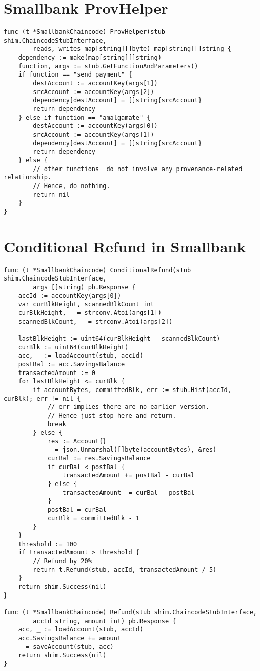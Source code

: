 \section{Smallbank ProvHelper}
\label{ch:append:contracts:smallbank_prov}
\begin{lstlisting}
func (t *SmallbankChaincode) ProvHelper(stub shim.ChaincodeStubInterface, 
        reads, writes map[string][]byte) map[string][]string {
	dependency := make(map[string][]string)
	function, args := stub.GetFunctionAndParameters()
	if function == "send_payment" {
		destAccount := accountKey(args[1])
		srcAccount := accountKey(args[2])
		dependency[destAccount] = []string{srcAccount}
		return dependency
	} else if function == "amalgamate" {
		destAccount := accountKey(args[0])
		srcAccount := accountKey(args[1])
		dependency[destAccount] = []string{srcAccount}
		return dependency
	} else {
		// other functions  do not involve any provenance-related relationship.
		// Hence, do nothing.
		return nil
    }
}
\end{lstlisting}

\section{Conditional Refund in Smallbank}
\label{ch:append:contracts:cond_refund}
\begin{lstlisting}
func (t *SmallbankChaincode) ConditionalRefund(stub shim.ChaincodeStubInterface, 
        args []string) pb.Response {
	accId := accountKey(args[0])
	var curBlkHeight, scannedBlkCount int
	curBlkHeight, _ = strconv.Atoi(args[1])
	scannedBlkCount, _ = strconv.Atoi(args[2])

	lastBlkHeight := uint64(curBlkHeight - scannedBlkCount)
	curBlk := uint64(curBlkHeight)
	acc, _ := loadAccount(stub, accId)
	postBal := acc.SavingsBalance
	transactedAmount := 0
	for lastBlkHeight <= curBlk {
		if accountBytes, committedBlk, err := stub.Hist(accId, curBlk); err != nil {
            // err implies there are no earlier version. 
            // Hence just stop here and return.
			break
		} else {
			res := Account{}
			_ = json.Unmarshal([]byte(accountBytes), &res)
			curBal := res.SavingsBalance
			if curBal < postBal {
				transactedAmount += postBal - curBal 
			} else {
				transactedAmount -= curBal - postBal
			}
			postBal = curBal
			curBlk = committedBlk - 1
		}
	}
	threshold := 100
	if transactedAmount > threshold {
		// Refund by 20%
		return t.Refund(stub, accId, transactedAmount / 5) 
	}
	return shim.Success(nil)
}

func (t *SmallbankChaincode) Refund(stub shim.ChaincodeStubInterface, 
        accId string, amount int) pb.Response {
	acc, _ := loadAccount(stub, accId)
	acc.SavingsBalance += amount
	_ = saveAccount(stub, acc)
	return shim.Success(nil)
}
\end{lstlisting}

